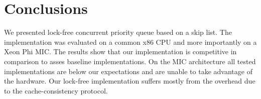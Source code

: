 \section{Conclusions}
\label{sec:con}
We presented lock-free concurrent priority queue based on a skip list. The implementation was evaluated on a common x86 CPU and more importantly on a Xeon Phi MIC. The results show that our implementation is competitive in comparison to asses baseline implementations. On the MIC architecture all tested implementations are below our expectations and are unable to take advantage of the hardware. Our lock-free implementation suffers mostly from the overhead due to the cache-consistency protocol.